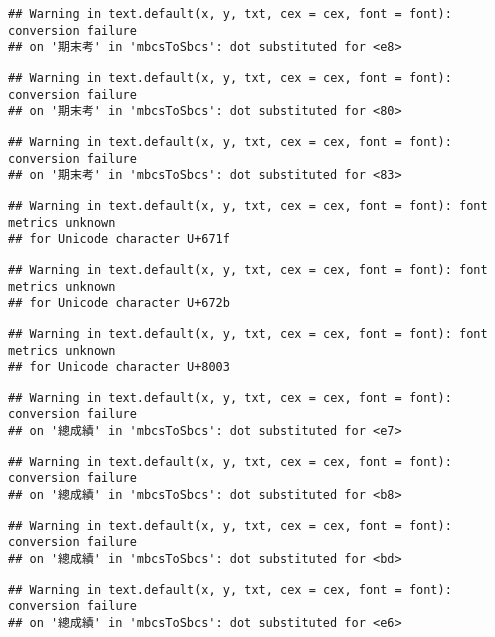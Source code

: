 \documentclass[
]{book}
\begin{document}
\begin{verbatim}
## Warning in text.default(x, y, txt, cex = cex, font = font): conversion failure
## on '期末考' in 'mbcsToSbcs': dot substituted for <e8>
\end{verbatim}

\begin{verbatim}
## Warning in text.default(x, y, txt, cex = cex, font = font): conversion failure
## on '期末考' in 'mbcsToSbcs': dot substituted for <80>
\end{verbatim}

\begin{verbatim}
## Warning in text.default(x, y, txt, cex = cex, font = font): conversion failure
## on '期末考' in 'mbcsToSbcs': dot substituted for <83>
\end{verbatim}

\begin{verbatim}
## Warning in text.default(x, y, txt, cex = cex, font = font): font metrics unknown
## for Unicode character U+671f
\end{verbatim}

\begin{verbatim}
## Warning in text.default(x, y, txt, cex = cex, font = font): font metrics unknown
## for Unicode character U+672b
\end{verbatim}

\begin{verbatim}
## Warning in text.default(x, y, txt, cex = cex, font = font): font metrics unknown
## for Unicode character U+8003
\end{verbatim}

\begin{verbatim}
## Warning in text.default(x, y, txt, cex = cex, font = font): conversion failure
## on '總成績' in 'mbcsToSbcs': dot substituted for <e7>
\end{verbatim}

\begin{verbatim}
## Warning in text.default(x, y, txt, cex = cex, font = font): conversion failure
## on '總成績' in 'mbcsToSbcs': dot substituted for <b8>
\end{verbatim}

\begin{verbatim}
## Warning in text.default(x, y, txt, cex = cex, font = font): conversion failure
## on '總成績' in 'mbcsToSbcs': dot substituted for <bd>
\end{verbatim}

\begin{verbatim}
## Warning in text.default(x, y, txt, cex = cex, font = font): conversion failure
## on '總成績' in 'mbcsToSbcs': dot substituted for <e6>
\end{verbatim}
\end{document}
